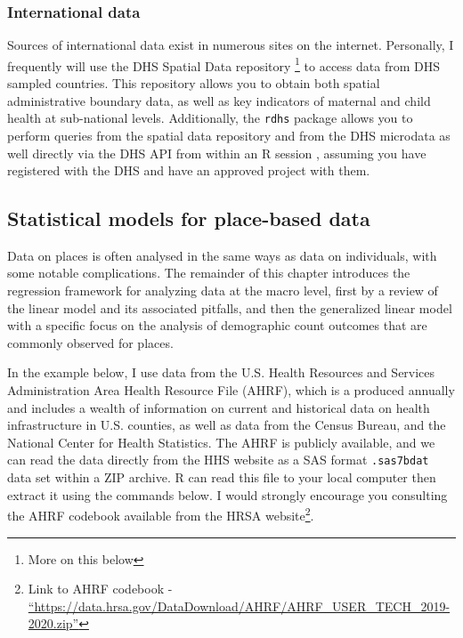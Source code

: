 \documentclass[
]{article}
\begin{document}
\hypertarget{international-data}{%
\subsubsection{International data}\label{international-data}}

Sources of international data exist in numerous sites on the internet. Personally, I frequently will use the DHS Spatial Data repository \footnote{More on this below} to access data from DHS sampled countries. This repository allows you to obtain both spatial administrative boundary data, as well as key indicators of maternal and child health at sub-national levels. Additionally, the \texttt{rdhs} package allows you to perform queries from the spatial data repository and from the DHS microdata as well directly via the DHS API from within an R session \citep{rdhs}, assuming you have registered with the DHS and have an approved project with them.

\hypertarget{statistical-models-for-place-based-data}{%
\subsection{Statistical models for place-based data}\label{statistical-models-for-place-based-data}}

Data on places is often analysed in the same ways as data on individuals, with some notable complications. The remainder of this chapter introduces the regression framework for analyzing data at the macro level, first by a review of the linear model and its associated pitfalls, and then the generalized linear model with a specific focus on the analysis of demographic count outcomes that are commonly observed for places.

In the example below, I use data from the U.S. Health Resources and Services Administration Area Health Resource File (AHRF), which is a produced annually and includes a wealth of information on current and historical data on health infrastructure in U.S. counties, as well as data from the Census Bureau, and the National Center for Health Statistics. The AHRF is publicly available, and we can read the data directly from the HHS website as a SAS format \texttt{.sas7bdat} data set within a ZIP archive. R can read this file to your local computer then extract it using the commands below. I would strongly encourage you consulting the AHRF codebook available from the HRSA website\footnote{Link to AHRF codebook - \href{https://data.hrsa.gov/DataDownload/AHRF/AHRF_USER_TECH_2019-2020.zip}{``https://data.hrsa.gov/DataDownload/AHRF/AHRF\_USER\_TECH\_2019-2020.zip''}}.
\end{document}
